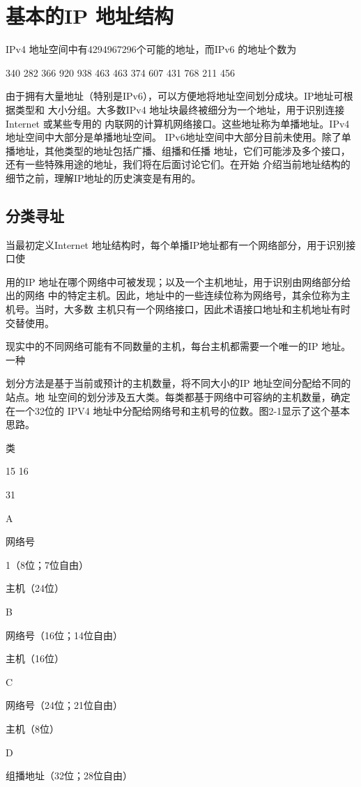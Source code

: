 \section{基本的IP 地址结构}
IPv4 地址空间中有4294967296个可能的地址，而IPv6 的地址个数为

340 282 366 920 938 463 463 374 607 431 768 211 456

由于拥有大量地址（特别是IPv6），可以方便地将地址空间划分成块。IP地址可根据类型和
大小分组。大多数IPv4 地址块最终被细分为一个地址，用于识别连接 Internet 或某些专用的
内联网的计算机网络接口。这些地址称为单播地址。IPv4地址空间中大部分是单播地址空间。
IPv6地址空间中大部分目前未使用。除了单播地址，其他类型的地址包括广播、组播和任播
地址，它们可能涉及多个接口，还有一些特殊用途的地址，我们将在后面讨论它们。在开始
介绍当前地址结构的细节之前，理解IP地址的历史演变是有用的。

\subsection{分类寻址}
当最初定义Internet 地址结构时，每个单播IP地址都有一个网络部分，用于识别接口使

用的IP 地址在哪个网络中可被发现；以及一个主机地址，用于识别由网络部分给出的网络
中的特定主机。因此，地址中的一些连续位称为网络号，其余位称为主机号。当时，大多数
主机只有一个网络接口，因此术语接口地址和主机地址有时交替使用。

现实中的不同网络可能有不同数量的主机，每台主机都需要一个唯一的IP 地址。一种

划分方法是基于当前或预计的主机数量，将不同大小的IP 地址空间分配给不同的站点。地
址空间的划分涉及五大类。每类都基于网络中可容纳的主机数量，确定在一个32位的 IPV4
地址中分配给网络号和主机号的位数。图2-1显示了这个基本思路。

类

15 16

31

A

网络号

1（8位；7位自由）

主机（24位）

B

网络号（16位；14位自由）

主机（16位）

C

网络号（24位；21位自由）

主机（8位）

D

组播地址（32位；28位自由）

